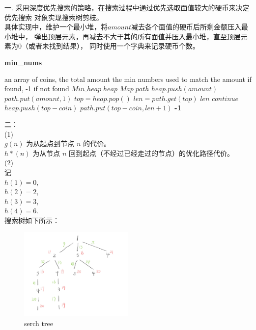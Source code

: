 \documentclass{article}
\begin{document}
一.
采用深度优先搜索的策略，在搜索过程中通过优先选取面值较大的硬币来决定优先搜索
对象实现搜索树剪枝。\\
具体实现中，维护一个最小堆，将$amount$减去各个面值的硬币后所剩金额压入最小堆中，
弹出顶层元素，再减去不大于其的所有面值并压入最小堆，直至顶层元素为0（或者未找到结果），
同时使用一个字典来记录硬币个数。

\begin{algorithm}
    \caption{\textbf{min\_nums}}
    \label{alg:coins}
    \begin{algorithmic}[1]
        \REQUIRE an array of coins, the total amount
        \ENSURE the min numbers used to match the amount if found, -1 if not found
        \STATE $Min\_heap\; heap$
        \STATE $Map\; path$
        \STATE $heap.push(amount)$ 
        \STATE $path.put(amount, 1)$
        \STATE $top = heap.pop()$
        \STATE $len = path.get(top)$
        \RETURN $len$
        \ENDIF
        \STATE $continue$
        \ENDIF
        \STATE $heap.push(top - coin)$
        \STATE $path.put(top - coin, len + 1)$
        \ENDIF
        \ENDFOR
        \ENDWHILE
        \RETURN \textbf{-1}
    \end{algorithmic}
\end{algorithm}
\newpage

二：\\
(1)\\
$g(n)$ 为从起点到节点 $n$ 的代价。\\
$h*(n)$ 为从节点 $n$ 回到起点（不经过已经走过的节点）的优化路径代价。\\
(2)\\
记 \\
$h(1) = 0$, \\
$h(2) = 2$, \\
$h(3) = 3$, \\
$h(4) = 6$. \\
搜索树如下所示：\\
\begin{figure}[htbp]
    \centering
    \includegraphics[width=0.5\textwidth]{2.png}
    \caption{serch tree}
\end{figure} 
\end{document}
